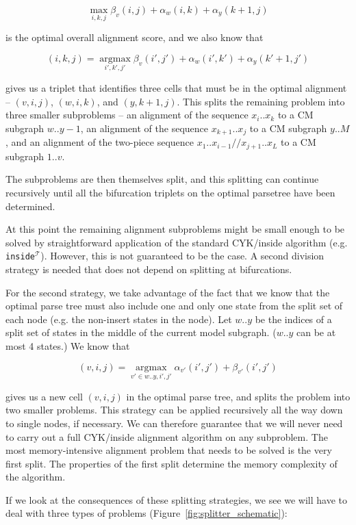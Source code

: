 \documentclass[11pt]{article}
\def\argmax{\mathop{\mathrm{argmax}}\limits}
\begin{document}
\[
   \max_{i,k,j} \beta_{v}(i,j) + \alpha_{w}(i,k) + \alpha_{y}(k+1,j)
\]

is the optimal overall alignment score, and we also know that

\[
      (i,k,j) = \argmax_{i',k',j'}  \beta_{v}(i',j') +
      \alpha_{w}(i',k') + \alpha_{y}(k'+1,j') 
\]

gives us a triplet that identifies three cells that must be in the
optimal alignment -- $(v,i,j)$, $(w,i,k)$, and $(y,k+1,j)$. This
splits the remaining problem into three smaller subproblems -- an
alignment of the sequence $x_{i}..x_{k}$ to a CM subgraph $w..y-1$, an
alignment of the sequence $x_{k+1}..x_{j}$ to a CM subgraph $y..M$,
and an alignment of the two-piece sequence
$x_1..x_{i-1}//x_{j+1}..x_L$ to a CM subgraph $1..v$.

The subproblems are then themselves split, and this splitting can
continue recursively until all the bifurcation triplets on the optimal
parsetree have been determined.

At this point the remaining alignment subproblems might be small
enough to be solved by straightforward application of the standard
CYK/inside algorithm (e.g. \texttt{inside}$^\mathcal{T}$). However,
this is not guaranteed to be the case. A second division strategy is
needed that does not depend on splitting at bifurcations.

For the second strategy, we take advantage of the fact that we know
that the optimal parse tree must also include one and only one state
from the split set of each node (e.g. the non-insert states in the
node). Let $w..y$ be the indices of a split set of states in the
middle of the current model subgraph. ($w..y$ can be at most 4
states.)  We know that

\[
(v,i,j) = \argmax_{v' \in w..y,i',j'} \alpha_{v'}(i',j') + \beta_{v'}(i',j')
\]

gives us a new cell $(v,i,j)$ in the optimal parse tree, and splits
the problem into two smaller problems. This strategy can be applied
recursively all the way down to single nodes, if necessary. We can
therefore guarantee that we will never need to carry out a full
CYK/inside alignment algorithm on any subproblem. The most
memory-intensive alignment problem that needs to be solved is the very
first split.  The properties of the first split determine the memory
complexity of the algorithm.

If we look at the consequences of these splitting strategies, we see
we will have to deal with three types of problems
(Figure~\ref{fig:splitter_schematic}):
\end{document}
